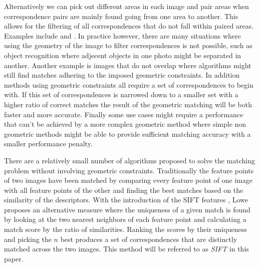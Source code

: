 \documentclass[12pt,journal]{IEEEtran}
\begin{document}
%
Alternatively we can pick out different areas in each image and pair 
areas when correspondence pairs are mainly found going from one area to 
another. This allows for the filtering of all correspondences that do 
not fall within paired areas. Examples include \cite{das2008event} and 
\cite{wu2011robust}.
%
%
In practice however, there are many situations where using the geometry 
of the image to filter correspondences is not possible, such as object 
recognition where adjecent objects in one photo might be separated in 
another. Another example is images that do not overlap where algorithms 
might still find matches adhering to the imposed geometric constraints.
In addition methods using geometric constraints all require a set of 
correspondences to begin with. If this set of correspondences is 
narrowed down to a smaller set with a higher ratio of correct matches 
the result of the geometric matching will be both faster and more 
accurate.  Finally some use cases might require a performance that can't 
be achieved by a more complex geometric method where simple non 
geometric methods might be able to provide sufficient matching accuracy 
with a smaller performance penalty.

There are a relatively small number of algorithms proposed to solve the 
matching problem without involving geometric constraints. Traditionally 
the feature points of two images have been matched by comparing every 
feature point of one image with all feature points of the other and 
finding the best matches based on the similarity of the descriptors.  
With the introduction of the SIFT features \cite{lowe2004sift}, Lowe 
proposes an alternative measure where the uniqueness of a given match is 
found by looking at the two nearest neighbors of each feature point and 
calculating a match score by the ratio of similarities. Ranking the 
scores by their uniqueness and picking the $n$ best produces a set of 
correspondences that are distinctly matched across the two images. This 
method will be referred to as \emph{SIFT} in this paper.
\end{document}
